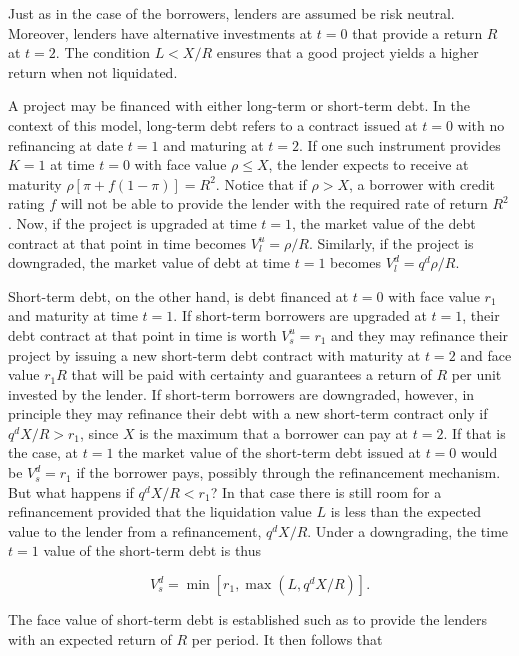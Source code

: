 \documentclass[11pt,a4paper]{article}
\begin{document}
Just as in the case of the borrowers, lenders are assumed be risk neutral. Moreover, lenders have
alternative investments at \(t = 0\) that provide a return \(R\) at \(t = 2\). The condition
\(L < X/R\) ensures that a good project yields a higher return when not liquidated.

A project may be financed with either long-term or short-term debt. In the context of this model,
long-term debt refers to a contract issued at \(t = 0\) with no refinancing at date \(t = 1\) and
maturing at \(t = 2\). If one such instrument provides \(K = 1\) at time \(t = 0\) with face value
\(\rho \le X\), the lender expects to receive at maturity \(\rho[\pi + f(1 - \pi)] = R^2\). Notice
that if \(\rho > X\), a borrower with credit rating \(f\) will not be able to provide the lender
with the required rate of return \(R^2\). Now, if the project is upgraded at time \(t = 1\), the
market value of the debt contract at that point in time becomes \(V_l^u = \rho/R\). Similarly, if
the project is downgraded, the market value of debt at time \(t = 1\) becomes \(V_l^d = q^d\rho/R\).

Short-term debt, on the other hand, is debt financed at \(t = 0\) with face value \(r_1\) and
maturity at time \(t = 1\). If short-term borrowers are upgraded at \(t = 1\), their debt contract
at that point in time is worth \(V_s^u = r_1\) and they may refinance their project by issuing a new
short-term debt contract with maturity at \(t = 2\) and face value \(r_1 R\) that will be paid with
certainty and guarantees a return of \(R\) per unit invested by the lender. If short-term borrowers
are downgraded, however, in principle they may refinance their debt with a new short-term contract
only if \(q^d X/R > r_1\), since \(X\) is the maximum that a borrower can pay at \(t = 2\). If that
is the case, at \(t = 1\) the market value of the short-term debt issued at \(t = 0\) would be
\(V_s^d = r_1\) if the borrower pays, possibly through the refinancement mechanism. But what happens
if \(q^d X/R < r_1\)? In that case there is still room for a refinancement provided that the
liquidation value \(L\) is less than the expected value to the lender from a refinancement,
\(q^d X/R\). Under a downgrading, the time \(t = 1\) value of the short-term debt is thus

\[V_s^d = \min\left[r_1, \max(L, q^d X/R)\right].\]

The face value of short-term debt is established such as to provide the lenders with an expected
return of \(R\) per period. It then follows that
\end{document}
